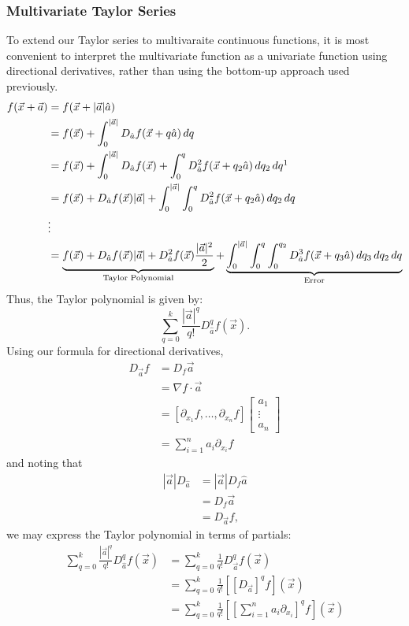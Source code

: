 \documentclass{article}
\theoremstyle{definition}
\begin{document}
\subsubsection{Multivariate Taylor Series}
To extend our Taylor series to multivaraite continuous functions, it is most convenient to interpret the multivariate function as a univariate function using directional derivatives, rather than using the bottom-up approach used previously.
\begin{align*}
	f(\vec x+\vec a)&=f(\vec x+|\vec a|\hat{a})\\
	&=f(\vec x)+\int_0^{|\vec a|}D_{\hat{a}}f(\vec x+q\hat{a})\,dq\\
	&=f(\vec x)+\int_0^{|\vec a|}D_{\hat{a}}f(\vec x)+\int_0^{q}D_{\hat{a}}^2f(\vec x+q_2\hat{a})\,dq_2\,dq\footnotemark{}\\
	&=f(\vec x)+D_{\hat{a}}f(\vec x)|\vec a|+\int_0^{|\vec a|}\int_0^{q}D_{\hat{a}}^2f(\vec x+q_2\hat{a})\,dq_2\,dq\\
	&\vdots\\
	&=\underbrace{f(\vec x)+D_{\hat{a}}f(\vec x)|\vec a|+D_{\hat{a}}^2f(\vec x)\frac{|\vec a|^2}{2}}_{\text{\normalfont Taylor Polynomial}}+\underbrace{\int_0^{|\vec a|}\int_0^{q}\int_0^{q_2}D_{\hat{a}}^3f(\vec x+q_3\hat{a})\,dq_3\,dq_2\,dq}_{\text{\normalfont Error}}
\end{align*}
Thus, the Taylor polynomial is given by:
\[\sum_{q=0}^k\frac{|\vec a|^q}{q!}D_{\hat{a}}^qf(\vec x).\]
Using our formula for directional derivatives,
\begin{align*}
	D_{\vec{a}}f&=D_f\vec{a}\\
	&=\nabla f\cdot\vec{a}\\
	&=[\partial_{x_1}f,\dots,\partial_{x_n}f]\begin{bmatrix}a_1\\\vdots\\a_n\end{bmatrix}\\
	&=\sum_{i=1}^na_i\partial_{x_i}f
\end{align*}
and noting that
\begin{align*}
	|\vec{a}|D_{\hat a}&=|\vec{a}|D_f\hat a\\
	&=D_f\vec{a}\\
	&=D_{\vec{a}}f,
\end{align*}
we may express the Taylor polynomial in terms of partials:
\begin{align*}
	\sum_{q=0}^k\frac{|\vec a|^q}{q!}D_{\hat{a}}^qf(\vec x)&=\sum_{q=0}^k\frac{1}{q!}D_{\vec{a}}^qf(\vec x)\\
	&=\sum_{q=0}^k\frac{1}{q!}\left[\left[D_{\vec{a}}\right]^qf\right](\vec x)\\
	&=\sum_{q=0}^k\frac{1}{q!}\left[\left[\sum_{i=1}^na_i\partial_{x_i}\right]^qf\right](\vec x)
\end{align*}
\end{document}
